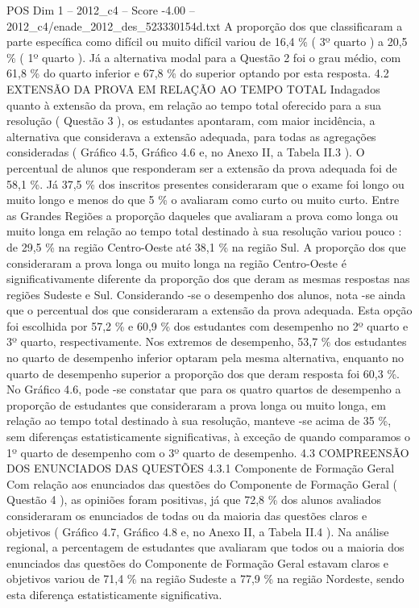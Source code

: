 \begin{textsample}{POS Dim 1 – 2012\_c4 – Score -4.00 – 2012\_c4/enade\_2012\_des\_523330154d.txt}
A proporção dos que classificaram a parte específica como difícil ou muito difícil variou de 16,4 \% ( 3º quarto ) a 20,5 \% ( 1º quarto ).
Já a alternativa modal para a Questão 2 foi o grau médio, com 61,8 \% do quarto inferior e 67,8 \% do superior optando por esta resposta. 4.2 EXTENSÃO DA PROVA EM RELAÇÃO AO TEMPO TOTAL Indagados quanto à extensão da prova, em relação ao tempo total oferecido para a sua resolução ( Questão 3 ), os estudantes apontaram, com maior incidência, a alternativa que considerava a extensão adequada, para todas as agregações consideradas ( Gráfico 4.5, Gráfico 4.6 e, no Anexo II, a Tabela II.3 ).
O percentual de alunos que responderam ser a extensão da prova adequada foi de 58,1 \%.
Já 37,5 \% dos inscritos presentes consideraram que o exame foi longo ou muito longo e menos do que 5 \% o avaliaram como curto ou muito curto.
Entre as Grandes Regiões a proporção daqueles que avaliaram a prova como longa ou muito longa em relação ao tempo total destinado à sua resolução variou pouco : de 29,5 \% na região Centro-Oeste até 38,1 \% na região Sul.
A proporção dos que consideraram a prova longa ou muito longa na região Centro-Oeste é significativamente diferente da proporção dos que deram as mesmas respostas nas regiões Sudeste e Sul.
Considerando -se o desempenho dos alunos, nota -se ainda que o percentual dos que consideraram a extensão da prova adequada.
Esta opção foi escolhida por 57,2 \% e 60,9 \% dos estudantes com desempenho no 2º quarto e 3º quarto, respectivamente.
Nos extremos de desempenho, 53,7 \% dos estudantes no quarto de desempenho inferior optaram pela mesma alternativa, enquanto no quarto de desempenho superior a proporção dos que deram resposta foi 60,3 \%.
No Gráfico 4.6, pode -se constatar que para os quatro quartos de desempenho a proporção de estudantes que consideraram a prova longa ou muito longa, em relação ao tempo total destinado à sua resolução, manteve -se acima de 35 \%, sem diferenças estatisticamente significativas, à exceção de quando comparamos o 1º quarto de desempenho com o 3º quarto de desempenho. 4.3 COMPREENSÃO DOS ENUNCIADOS DAS QUESTÕES 4.3.1 Componente de Formação Geral Com relação aos enunciados das questões do Componente de Formação Geral ( Questão 4 ), as opiniões foram positivas, já que 72,8 \% dos alunos avaliados consideraram os enunciados de todas ou da maioria das questões claros e objetivos ( Gráfico 4.7, Gráfico 4.8 e, no Anexo II, a Tabela II.4 ).
Na análise regional, a percentagem de estudantes que avaliaram que todos ou a maioria dos enunciados das questões do Componente de Formação Geral estavam claros e objetivos variou de 71,4 \% na região Sudeste a 77,9 \% na região Nordeste, sendo esta diferença estatisticamente significativa.

\end{textsample}
